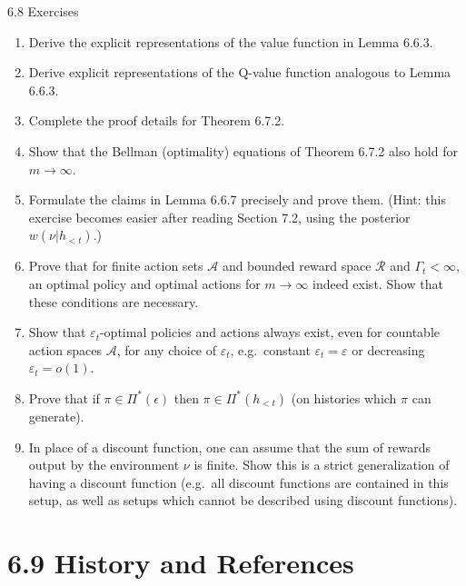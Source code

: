 \documentclass[aspectratio=169,10pt]{beamer}
\newcommand{\A}{\mathcal{A}}
\newcommand{\Rcal}{\mathcal{R}}
\begin{document}
\begin{frame}[allowframebreaks]{6.8 Exercises}
\begin{enumerate}
\framebreak
  \item [C15i] Derive the explicit representations of the value function in
    Lemma 6.6.3.
  \item [C15] Derive explicit representations of the Q-value function
    analogous to Lemma 6.6.3.
  \item [C20] Complete the proof details for Theorem 6.7.2.
  \item [C18] Show that the Bellman (optimality) equations of Theorem 6.7.2
    also hold for $m \to \infty$.
  \item [C20] Formulate the claims in Lemma 6.6.7 precisely and prove them.
    (Hint: this exercise becomes easier after reading Section 7.2, using
    the posterior $w(\nu|h_{<t})$.)
  \item [C20i] Prove that for finite action sets $\A$ and bounded reward
    space $\Rcal$ and $\Gamma_t < \infty$, an optimal policy and optimal
    actions for $m\to\infty$ indeed exist. Show that these conditions are
    necessary.
  \item [C25i] Show that $\varepsilon_t$-optimal policies and actions always
    exist, even for countable action spaces $\A$, for any choice of
    $\varepsilon_t$, e.g.\ constant $\varepsilon_t=\varepsilon$ or
    decreasing $\varepsilon_t=o(1)$.
  \item [C15] Prove that if $\pi \in \Pi^{*}(\epsilon)$ then $\pi \in
    \Pi^{*}(h_{<t})$ (on histories which $\pi$ can generate).
  \item [C22] In place of a discount function, one can assume that the sum
    of rewards output by the environment $\nu$ is finite. Show this is a
    strict generalization of having a discount function (e.g.\ all discount
    functions are contained in this setup, as well as setups which cannot
    be described using discount functions).
\end{enumerate}
\end{frame}

\section{6.9 History and References}
\end{document}

